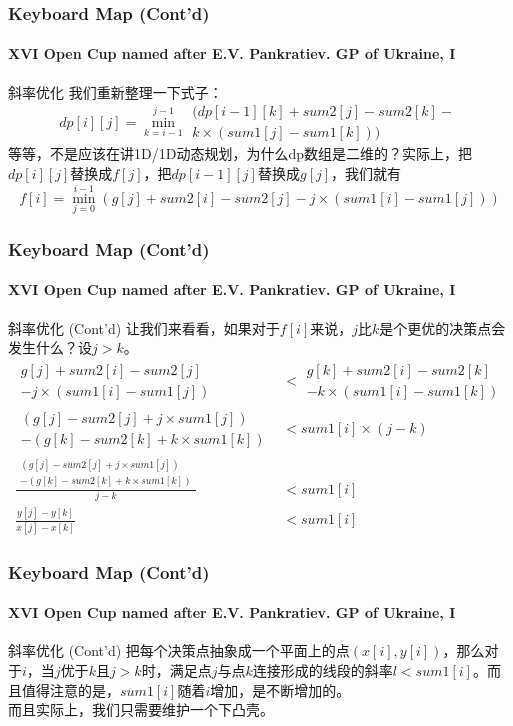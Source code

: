 \documentclass[hyperref={unicode=true}]{beamer}
\theoremstyle{definition}
\theoremstyle{proof}
\begin{document}
\begin{frame}\frametitle{Keyboard Map (Cont'd)}
  \framesubtitle{XVI Open Cup named after E.V. Pankratiev. GP of Ukraine, I}
  \begin{exampleblock}{斜率优化}
    我们重新整理一下式子：
    \[dp[i][j] = \min_{k=i-1}^{j-1}{\substack{(dp[i-1][k] + sum2[j] - sum2[k] - \\k \times (sum1[j] - sum1[k]))}}\]
    等等，不是应该在讲1D/1D动态规划，为什么dp数组是二维的？实际上，把$dp[i][j]$替换成$f[j]$，把$dp[i-1][j]$替换成$g[j]$，我们就有
    \[f[i] = \min_{j=0}^{i-1}{(g[j] + sum2[i] - sum2[j] - j \times (sum1[i] - sum1[j]))}\]
  \end{exampleblock}
\end{frame}
\begin{frame}\frametitle{Keyboard Map (Cont'd)}
  \framesubtitle{XVI Open Cup named after E.V. Pankratiev. GP of Ukraine, I}
  \begin{exampleblock}{斜率优化 (Cont'd)}
    让我们来看看，如果对于$f[i]$来说，$j$比$k$是个更优的决策点会发生什么？设$j>k$。
    \begin{align}
      \substack{g[j] + sum2[i] - sum2[j] \\- j \times (sum1[i] - sum1[j])} &< \substack{g[k] + sum2[i] - sum2[k] \\-k \times (sum1[i] - sum1[k])}\\
      \substack{(g[j] - sum2[j] + j \times sum1[j]) \\-(g[k] - sum2[k] + k \times sum1[k])} &< sum1[i] \times (j - k)\\
      \frac{\substack{(g[j] - sum2[j] + j \times sum1[j]) \\-(g[k] - sum2[k] + k \times sum1[k])}}{j-k} &< sum1[i]\\
      \frac{y[j]-y[k]}{x[j]-x[k]} &< sum1[i]
    \end{align}
  \end{exampleblock}
\end{frame}
\begin{frame}[fragile]\frametitle{Keyboard Map (Cont'd)}
  \framesubtitle{XVI Open Cup named after E.V. Pankratiev. GP of Ukraine, I}
  \begin{exampleblock}{斜率优化 (Cont'd)}
    把每个决策点抽象成一个平面上的点$(x[i],y[i])$，那么对于$i$，当$j$优于$k$且$j>k$时，满足点$j$与点$k$连接形成的线段的斜率$l < sum1[i]$。而且值得注意的是，$sum1[i]$随着$i$增加，是不断增加的。\\
    而且实际上，我们只需要维护一个下凸壳。
  \end{exampleblock}
\end{frame}
\end{document}
